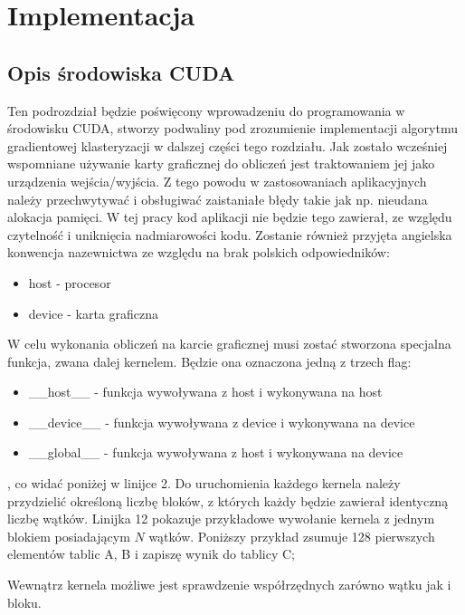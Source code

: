 \chapter{Implementacja}
\label{cha:implementacja}

\section{Opis środowiska CUDA}
\label{sec:opis_cuda}

Ten podrozdział będzie poświęcony wprowadzeniu do programowania w środowisku CUDA, stworzy podwaliny pod zrozumienie implementacji algorytmu gradientowej klasteryzacji w dalszej części tego rozdziału. Jak zostało wcześniej wspomniane używanie karty graficznej do obliczeń jest traktowaniem jej jako urządzenia wejścia/wyjścia. Z tego powodu w zastosowaniach aplikacyjnych należy przechwytywać i obsługiwać zaistaniałe błędy takie jak np. nieudana alokacja pamięci. W tej pracy kod aplikacji nie będzie tego zawierał, ze względu czytelność i uniknięcia nadmiarowości kodu. Zostanie również przyjęta angielska konwencja nazewnictwa ze względu na brak polskich odpowiedników:
\begin{itemize}
\item host - procesor
\item device - karta graficzna
\end{itemize}

W celu wykonania obliczeń na karcie graficznej musi zostać stworzona specjalna funkcja, zwana dalej kernelem. Będzie ona oznaczona jedną z trzech flag:
\begin{itemize}
\item \_\_host\_\_ - funkcja wywoływana z host i wykonywana na host
\item \_\_device\_\_ - funkcja wywoływana z device i wykonywana na device
\item \_\_global\_\_ - funkcja wywoływana z host i wykonywana na device 
\end{itemize}
, co widać poniżej w linijce 2. Do uruchomienia każdego kernela należy przydzielić określoną liczbę bloków, z których każdy będzie zawierał identyczną liczbę wątków. Linijka 12 pokazuje przykładowe wywołanie kernela z jednym blokiem posiadającym $N$ wątków. Poniższy przykład zsumuje 128 pierwszych elementów tablic A, B i zapiszę wynik do tablicy C;


Wewnątrz kernela możliwe jest sprawdzenie współrzędnych zarówno wątku jak i bloku.



